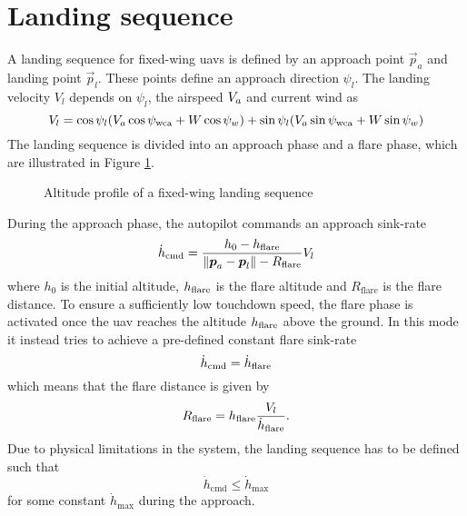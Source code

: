 \section{Landing sequence}
A landing sequence for fixed-wing \acp{uav} is defined by an approach point $\vec{p}_a$ and landing point $\vec{p}_l$. These points 
define an approach direction $\psi_l$. The landing velocity $V_l$ depends on $\psi_l$, the airspeed $V_a$ and current wind as 
\begin{equation}
    V_l=\cos\psi_l(V_a\cos\psi_{\text{wca}}+W\cos\psi_w) + \sin\psi_l(V_a\sin\psi_{\text{wca}}+W\sin\psi_w)
\end{equation}
The landing sequence is divided into an approach phase and a flare phase, which are illustrated in Figure \ref{fig:land_alt}.
\begin{figure}[H]
    \begin{center}
    \end{center}
    \caption{Altitude profile of a fixed-wing landing sequence}
    \label{fig:land_alt}
\end{figure}
During the approach phase, the autopilot commands an approach sink-rate
\begin{equation}\label{eq:sink_rate}
    \dot{h}_{\text{cmd}}=\frac{h_0-h_{\text{flare}}}{\|\boldsymbol{p}_a-\boldsymbol{p}_l\|-R_{\text{flare}}}V_l
\end{equation}
where $h_0$ is the initial altitude, $h_{\text{flare}}$ is the flare altitude and $R_{\text{flare}}$ is the flare distance.
To ensure a sufficiently low touchdown speed, the flare phase is activated once the \ac{uav} reaches the altitude $h_{\text{flare}}$ above the ground. 
In this mode it instead tries to achieve a pre-defined constant flare sink-rate 
\begin{equation}
    \dot{h}_{\text{cmd}}=\dot{h}_{\text{flare}}
\end{equation}
which means that the flare distance is given by
\begin{equation}\label{eq:R_flare}
    R_{\text{flare}}=h_{\text{flare}}\frac{V_l}{\dot{h}_{\text{flare}}}.
\end{equation}
Due to physical limitations in the system, the landing sequence has to be defined such that 
\begin{equation}\label{eq:sink_constraint}
    \dot{h}_{\text{cmd}}\leq\dot{h}_{\text{max}}
\end{equation}
for some constant $\dot{h}_{\text{max}}$ during the approach.

